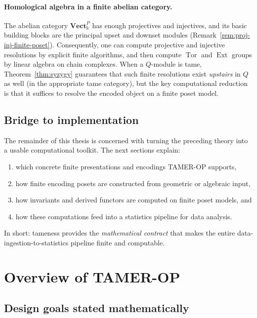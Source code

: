 \documentclass{article}
\newcommand{\kk}{\Bbbk}
\newcommand{\<}{\langle}
\renewcommand{\>}{\rangle}
\DeclareMathOperator{\Tor}{Tor}
\DeclareMathOperator{\Ext}{Ext}
\theoremstyle{definition}
\theoremstyle{remark}
\begin{document}
	\paragraph{Homological algebra in a finite abelian category.}
	The abelian category $\mathbf{Vect}_{\kk}^{P}$ has enough projectives and injectives,
	and its basic building blocks are the principal upset and downset modules
	(Remark~\ref{rem:proj-inj-finite-poset}).  Consequently, one can compute projective and
	injective resolutions by explicit finite algorithms, and then compute $\Tor$ and $\Ext$
	groups by linear algebra on chain complexes.
	When a $Q$-module is tame, Theorem~\ref{thm:syzygy} guarantees that such finite
	resolutions exist \emph{upstairs} in $Q$ as well (in the appropriate tame category),
	but the key computational reduction is that it suffices to resolve the encoded object on
	a finite poset model.
	
	\subsection{Bridge to implementation}
	\label{subsec:tame-bridge}
	
	The remainder of this thesis is concerned with turning the preceding theory into a
	usable computational toolkit.  The next sections explain:
	\begin{enumerate}[label=(\roman*)]
		\item which concrete finite presentations and encodings TAMER-OP supports,
		\item how finite encoding posets are constructed from geometric or algebraic input,
		\item how invariants and derived functors are computed on finite poset models, and
		\item how these computations feed into a statistics pipeline for data analysis.
	\end{enumerate}
	In short: tameness provides the \emph{mathematical contract} that makes the entire
	data-ingestion-to-statistics pipeline finite and computable.
	
	
	
	\section{Overview of TAMER-OP}
	

	
	
	\subsection{Design goals stated mathematically}
	
\end{document}
